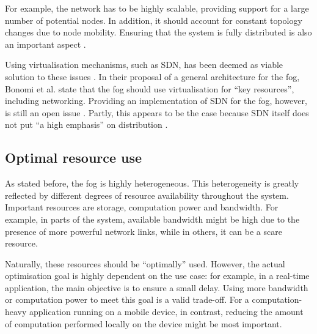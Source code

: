 \documentclass{article}
\begin{document}
For example, the network has to be highly scalable, providing support for a large number of potential nodes. In addition, it should account for constant topology changes due to node mobility. Ensuring that the system is fully distributed is also an important aspect \cite{yi2015survey}.

Using virtualisation mechanisms, such as SDN, has been deemed as viable solution to these issues \cite{yi2015survey}. In their proposal of a general architecture for the fog, Bonomi et al. \cite{bonomi2014fog} state that the fog should use virtualisation for ``key resources'', including networking. Providing an implementation of SDN for the fog, however, is still an open issue \cite{yi2015survey}. Partly, this appears to be the case because SDN itself does not put ``a high emphasis'' on distribution \cite{peng2016fog}.


\subsection{Optimal resource use}
\label{sub_opt_res_use}

As stated before, the fog is highly heterogeneous. This heterogeneity is greatly reflected by different degrees of resource availability throughout the system. Important resources are storage, computation power and bandwidth. For example, in parts of the system, available bandwidth might be high due to the presence of more powerful network links, while in others, it can be a scare resource.

Naturally, these resources should be ``optimally'' used. However, the actual optimisation goal is highly dependent on the use case: for example, in a real-time application, the main objective is to ensure a small delay. Using more bandwidth or computation power to meet this goal is a valid trade-off. For a computation-heavy application running on a mobile device, in contrast, reducing the amount of computation performed locally on the device might be most important.
\end{document}

